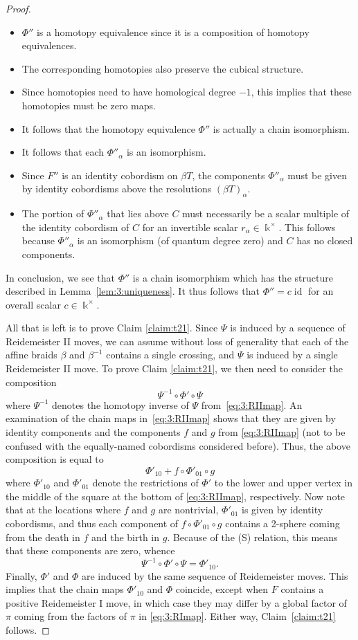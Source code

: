 \documentclass[12pt]{amsart}
\theoremstyle{definition}
\theoremstyle{plain}
\begin{document}
\begin{proof}
\begin{itemize}
\item $\Phi''$ is a homotopy equivalence since it is a composition of homotopy equivalences.
\item The corresponding homotopies also preserve the cubical structure.
\item Since homotopies need to have homological degree $-1$, this implies that these homotopies must be
zero maps.
\item It follows that the homotopy equivalence $\Phi''$ is actually a chain isomorphism.
\item It follows that each $\Phi''_\alpha$ is an isomorphism.
\item Since $F''$ is an identity cobordism on $\beta T$, the components $\Phi''_\alpha$
must be given by identity cobordisms above the resolutions $(\beta T)_\alpha$.
\item The portion of $\Phi''_\alpha$ that lies above $C$ must necessarily be a scalar multiple of the identity cobordism of $C$
for an invertible scalar $r_\alpha\in\Bbbk^\times$.
This follows because $\Phi''_\alpha$ is an isomorphism (of quantum degree zero) and $C$ has no closed components.
\end{itemize}

In conclusion, we see that $\Phi''$ is a chain isomorphism which has the structure described in Lemma~\ref{lem:3:uniqueness}. It thus follows
that $\Phi''=c\operatorname{id}$ for an overall scalar $c\in\Bbbk^\times$.

All that is left is to prove Claim \ref{claim:t21}.
Since $\Psi$ is induced by a sequence of  Reidemeister II moves, we can assume without loss of generality
that each of the affine braids $\beta$ and $\beta^{-1}$ contains a single crossing, and $\Psi$ is induced by a single  Reidemeister II move.
To prove Claim \ref{claim:t21}, we then need to consider the composition
\[
\Psi^{-1}\circ\Phi'\circ\Psi
\]
where $\Psi^{-1}$ denotes the homotopy inverse of $\Psi$ from~\eqref{eq:3:RIImap}.
An examination of the chain maps in~\eqref{eq:3:RIImap} shows that they are given by identity components and the components $f$ and $g$
from \eqref{eq:3:RIImap} (not to be confused with the equally-named cobordisms considered before).
Thus, the above composition is equal to
\[
\Phi'_{10}+f\circ\Phi'_{01}\circ g
\]
where
$\Phi'_{10}$ and $\Phi'_{01}$ denote the restrictions of $\Phi'$ to the lower and upper vertex in the middle
of the square at the bottom of \eqref{eq:3:RIImap}, respectively. Now note that at the locations where $f$ and $g$ are nontrivial,
$\Phi'_{01}$ is given by identity cobordisms, and thus each component of $f\circ\Phi'_{01}\circ g$ contains a 2-sphere coming from the death in $f$
and the birth in $g$. Because of the (S) relation, this means that these components are zero, whence
\[
\Psi^{-1}\circ\Phi'\circ\Psi=\Phi'_{10}.
\]
Finally, $\Phi'$ and $\Phi$ are induced by the same sequence of Reidemeister moves. This implies that the chain maps
$\Phi'_{10}$ and $\Phi$ coincide, except when $F$ contains a positive Reidemeister I move, in which case they
may differ by a global factor of $\pi$ coming from the factors of $\pi$ in \eqref{eq:3:RImap}. Either way, Claim~\ref{claim:t21} follows.
\end{proof}
\end{document}
